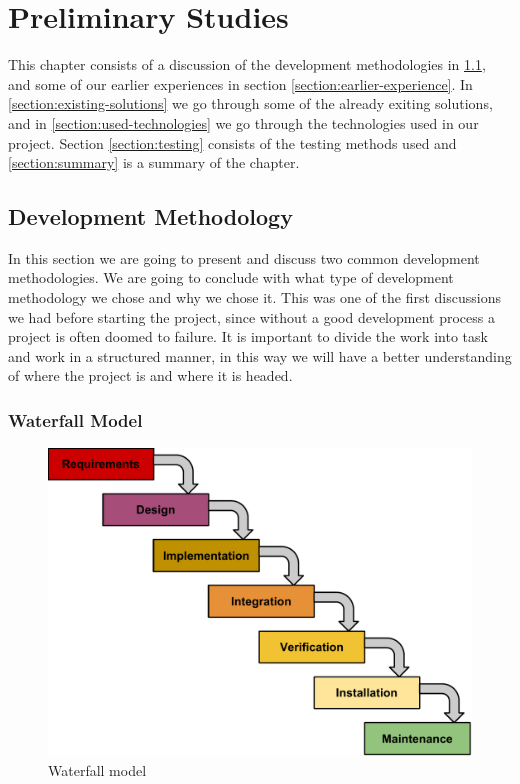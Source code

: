 \chapter{Preliminary Studies}
\label{Preliminary Studies}

This chapter consists of a discussion of the development methodologies in \ref{section:development-methodology}, and some of our earlier experiences in section \ref{section:earlier-experience}.
In \ref{section:existing-solutions} we go through some of the already exiting solutions, and in \ref{section:used-technologies} we go through the technologies used in our project.
Section \ref{section:testing} consists of the testing methods used and \ref{section:summary} is a summary of the chapter.



\section{Development Methodology}
\label{section:development-methodology}

In this section we are going to present and discuss two common development methodologies.
We are going to conclude with what type of development methodology we chose and why we chose it.
This was one of the first discussions we had before starting the project, since without a good development process a project is often doomed to failure.
It is important to divide the work into task and work in a structured manner, in this way we will have a better understanding of where the project is and where it is headed.

\subsection{Waterfall Model} \nocite{WaterfallModel}

\begin{figure}
\begin{center}
\includegraphics[scale=0.6]{../Figures/Waterfall-model.pdf}
\end{center}
\caption{Waterfall model}
\label{figure:waterfall-model}
\end{figure}

